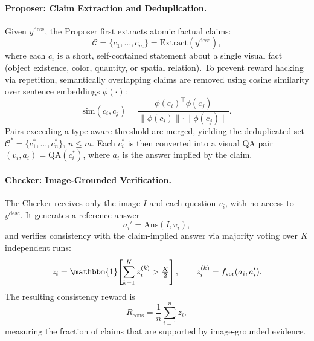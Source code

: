 \paragraph{Proposer: Claim Extraction and Deduplication.}
Given $y^{\mathrm{desc}}$, the Proposer first extracts atomic factual
claims:
\begin{equation}
    \mathcal{C} = \{c_1,\ldots,c_m\} = \mathrm{Extract}(y^{\mathrm{desc}}),
\end{equation}
where each $c_i$ is a short, self-contained statement about a single
visual fact (object existence, color, quantity, or spatial relation).
To prevent reward hacking via repetition, semantically overlapping
claims are removed using cosine similarity over sentence embeddings
$\phi(\cdot)$:
\begin{equation}
    \mathrm{sim}(c_i,c_j)
    = \frac{\phi(c_i)^\top \phi(c_j)}{\|\phi(c_i)\|\cdot\|\phi(c_j)\|}.
\end{equation}
Pairs exceeding a type-aware threshold are merged, yielding the
deduplicated set $\mathcal{C}^{\ast}=\{c_1^{\ast},\ldots,c_n^{\ast}\}$,
$n \leq m$.
Each $c_i^{\ast}$ is then converted into a visual QA pair
$(v_i, a_i) = \mathrm{QA}(c_i^{\ast})$, where $a_i$ is the answer
implied by the claim.

\paragraph{Checker: Image-Grounded Verification.}
The Checker receives only the image $I$ and each question $v_i$,
with no access to $y^{\mathrm{desc}}$. It generates a reference answer
\begin{equation}
    a_i' = \mathrm{Ans}(I, v_i),
\end{equation}
and verifies consistency with the claim-implied answer via majority
voting over $K$ independent runs:
\begin{equation}
    z_i = \mathbbm{1}\!\left[\sum_{k=1}^{K} z_i^{(k)} > \tfrac{K}{2}\right],
    \qquad z_i^{(k)} = f_{\mathrm{ver}}(a_i, a_i').
\end{equation}
The resulting consistency reward is
\begin{equation}
    R_{\mathrm{cons}} = \frac{1}{n}\sum_{i=1}^{n} z_i,
\end{equation}
measuring the fraction of claims that are supported by
image-grounded evidence.


